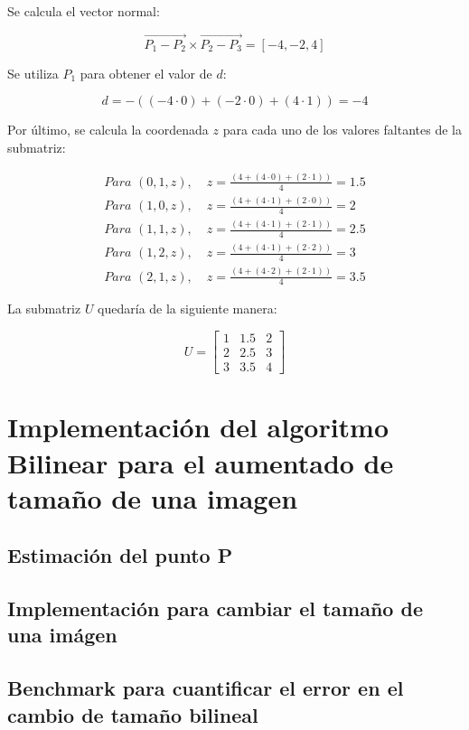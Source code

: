 \documentclass[12pt,a4paper]{article}
\begin{document}
Se calcula el vector normal:

\[
\vec{P_1 - P_2} \times \vec{P_2 - P_3} = [-4,-2,4]
\]

Se utiliza $P_1$ para obtener el valor de $d$:

\[
d = -((-4 \cdot 0) + (-2\cdot 0) + (4\cdot 1)) = -4
\]

Por último, se calcula la coordenada $z$ para cada uno de los valores faltantes de la submatriz:

\begin{align*}
\textit{Para } (0,1,z), \; & z = \frac{(4 + (4 \cdot 0) + (2 \cdot 1))}{4} = 1.5 \\[6pt]
\textit{Para } (1,0,z), \; & z = \frac{(4 + (4 \cdot 1) + (2 \cdot 0))}{4} = 2 \\[6pt]
\textit{Para } (1,1,z), \; & z = \frac{(4 + (4 \cdot 1) + (2 \cdot 1))}{4} = 2.5 \\[6pt]
\textit{Para } (1,2,z), \; & z = \frac{(4 + (4 \cdot 1) + (2 \cdot 2))}{4} = 3 \\[6pt]
\textit{Para } (2,1,z), \; & z = \frac{(4 + (4 \cdot 2) + (2 \cdot 1))}{4} = 3.5
\end{align*}

La submatriz $U$ quedaría de la siguiente manera:

\[
U =
    \begin{bmatrix}
    1 & 1.5 & 2 \\
    2 & 2.5 & 3 \\
    3 & 3.5 & 4
    \end{bmatrix}
\]

\section{Implementación del algoritmo Bilinear para el aumentado de tamaño de una imagen}

\subsection{Estimación del punto P}

\subsection{Implementación para cambiar el tamaño de una imágen}

\subsection{Benchmark para cuantificar el error en el cambio de tamaño bilineal}
\end{document}
